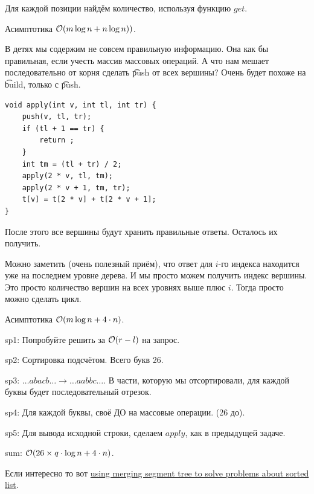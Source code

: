 \up \up
\begin{MyList}[0pt]
	\item Для каждой позиции найдём количество, используя функцию $get$.
	
	Асимптотика $\mathcal{O}(m \log n + n \log n))$.
	
	\item  В детях мы содержим не совсем правильную информацию. Она как бы правильная, если учесть массив массовых операций. А что нам мешает последовательно от корня сделать \t{push} от всех вершины? Очень будет похоже на \t{build}, только с \t{push}.
	
\begin{verbatim}
void apply(int v, int tl, int tr) {
	push(v, tl, tr);
	if (tl + 1 == tr) {
		return ;
	}
	int tm = (tl + tr) / 2;
	apply(2 * v, tl, tm);
	apply(2 * v + 1, tm, tr);
	t[v] = t[2 * v] + t[2 * v + 1];
}
\end{verbatim}

	После этого все вершины будут хранить правильные ответы. Осталось их получить.
	
	Можно заметить (очень полезный приём), что ответ для $i$-го индекса находится уже на последнем уровне дерева. И мы просто можем получить индекс вершины. Это просто количество вершин на всех уровнях выше плюс $i$. Тогда просто можно сделать цикл.
	
	Асимптотика $\mathcal{O}(m \log n + 4 \cdot n)$.
\end{MyList}


sp1: Попробуйте решить за $\mathcal{O}(r - l)$ на запрос.

sp2: Сортировка подсчётом. Всего букв 26.

sp3: $\dots abacb \dots  \rightarrow \dots aabbc \dots $. В части, которую мы отсортировали, для каждой буквы будет последовательный отрезок.

sp4: Для каждой буквы, своё ДО на массовые операции. (26 до).

sp5: Для вывода исходной строки, сделаем $apply$, как в предыдущей задаче.

sum: $\mathcal{O}(26 \times q \cdot \log n + 4 \cdot n)$.

Если интересно то вот \href{https://codeforces.com/blog/entry/49446}{using merging segment tree to solve problems about sorted list}.

\pagebreak


